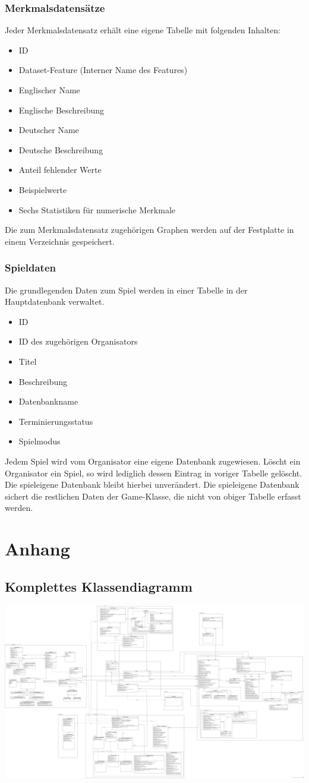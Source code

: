 \documentclass[a4paper]{scrreprt}
\begin{document}
	\subsection{Merkmalsdatensätze}
	Jeder Merkmalsdatensatz erhält eine eigene Tabelle mit folgenden Inhalten:
	\begin{itemize}
		\item ID
		\item Dataset-Feature (Interner Name des Features)
		\item Englischer Name
		\item Englische Beschreibung
		\item Deutscher Name
		\item Deutsche Beschreibung
		\item Anteil fehlender Werte
		\item Beispielwerte
		\item Sechs Statistiken für numerische Merkmale
	\end{itemize}
	Die zum Merkmalsdatensatz zugehörigen Graphen werden auf der Festplatte in einem Verzeichnis gespeichert.
	\subsection{Spieldaten}
	Die grundlegenden Daten zum Spiel werden in einer Tabelle in der Hauptdatenbank verwaltet.
	\begin{itemize}
		\item ID
		\item ID des zugehörigen Organisators
		\item Titel
		\item Beschreibung
		\item Datenbankname
		\item Terminierungsstatus
		\item Spielmodus
	\end{itemize}
	Jedem Spiel wird vom Organisator eine eigene Datenbank zugewiesen.
	Löscht ein Organisator ein Spiel, so wird lediglich dessen Eintrag in voriger Tabelle gelöscht.
	Die spieleigene Datenbank bleibt hierbei unverändert.
	Die spieleigene Datenbank sichert die restlichen Daten der Game-Klasse, die nicht von obiger Tabelle erfasst werden.


	\chapter{Anhang}
	\section{Komplettes Klassendiagramm}
	\includegraphics[width=\textwidth]{img/komplett.pdf}
\end{document}
